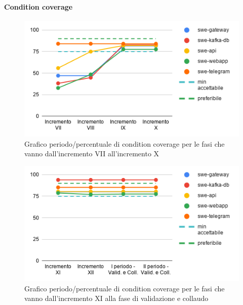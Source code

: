 \paragraph{Condition coverage}
	\begin{figure}[H]
			\centering
			\includegraphics[width=0.8\linewidth]{./res/images/QM-TEST-2-CONCO.png}
			\caption{Grafico periodo/percentuale di condition coverage per le fasi che vanno dall'incremento VII all'incremento X}
			\label{fig:Grafico periodo/percentuale di condition coverage per le fasi che vanno dall'incremento VII all'incremento X}
	\end{figure}
	\begin{figure}[H]
			\centering
			\includegraphics[width=0.8\linewidth]{./res/images/QM-TEST-2-CONCO_1.png}
			\caption{Grafico periodo/percentuale di condition coverage per le fasi che vanno dall'incremento XI alla fase di validazione e collaudo}
			\label{fig:Grafico periodo/percentuale di condition coverage per le fasi che vannodall'incremento XI alla fase di validazione e collaudo}
	\end{figure}

